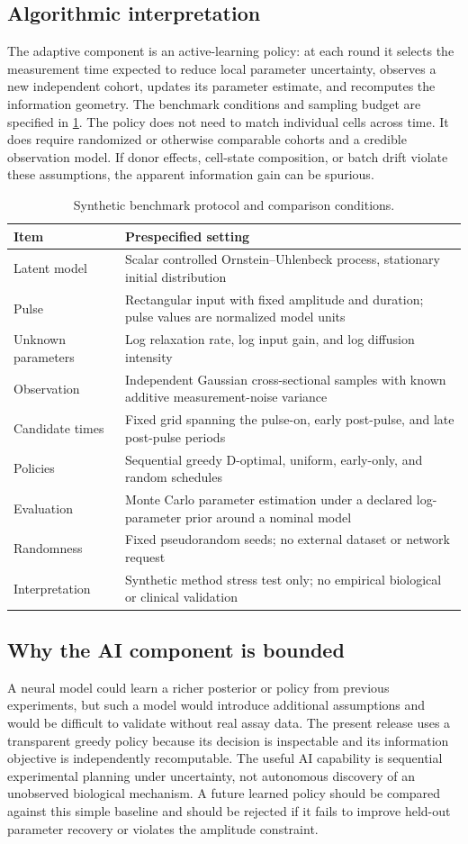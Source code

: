 \documentclass[11pt,a4paper]{article}
\begin{document}
\subsection{Algorithmic interpretation}
The adaptive component is an active-learning policy: at each round it selects the measurement time expected to reduce local parameter uncertainty, observes a new independent cohort, updates its parameter estimate, and recomputes the information geometry. The benchmark conditions and sampling budget are specified in \cref{tab:protocol}. The policy does not need to match individual cells across time. It does require randomized or otherwise comparable cohorts and a credible observation model. If donor effects, cell-state composition, or batch drift violate these assumptions, the apparent information gain can be spurious.
\begin{table}[!htbp]
\centering
\small
\caption{Synthetic benchmark protocol and comparison conditions.}
\label{tab:protocol}
\begin{tabularx}{\linewidth}{@{}p{2.4cm}X@{}}
\toprule
Item & Prespecified setting\\
\midrule
Latent model & Scalar controlled Ornstein--Uhlenbeck process, stationary initial distribution\\
Pulse & Rectangular input with fixed amplitude and duration; pulse values are normalized model units\\
Unknown parameters & Log relaxation rate, log input gain, and log diffusion intensity\\
Observation & Independent Gaussian cross-sectional samples with known additive measurement-noise variance\\
Candidate times & Fixed grid spanning the pulse-on, early post-pulse, and late post-pulse periods\\
Policies & Sequential greedy D-optimal, uniform, early-only, and random schedules\\
Evaluation & Monte Carlo parameter estimation under a declared log-parameter prior around a nominal model\\
Randomness & Fixed pseudorandom seeds; no external dataset or network request\\
Interpretation & Synthetic method stress test only; no empirical biological or clinical validation\\
\bottomrule
\end{tabularx}
\end{table}
\subsection{Why the AI component is bounded}
A neural model could learn a richer posterior or policy from previous experiments, but such a model would introduce additional assumptions and would be difficult to validate without real assay data. The present release uses a transparent greedy policy because its decision is inspectable and its information objective is independently recomputable. The useful AI capability is sequential experimental planning under uncertainty, not autonomous discovery of an unobserved biological mechanism. A future learned policy should be compared against this simple baseline and should be rejected if it fails to improve held-out parameter recovery or violates the amplitude constraint.
\end{document}
